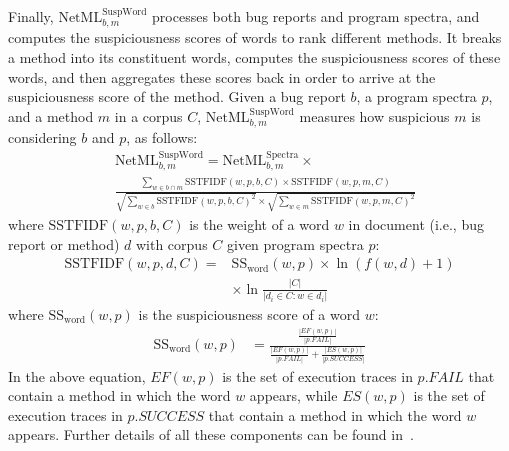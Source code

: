 Finally, $\text{NetML}^\text{SuspWord}_{b,m}$ processes both bug reports and program spectra, and computes the suspiciousness scores of words to rank different methods. It breaks a method into its constituent words, computes the suspiciousness scores of these words, and then aggregates these scores back in order to arrive at the suspiciousness score of the method. Given a bug report $b$, a program spectra $p$, and a method $m$ in a corpus $C$, $\text{NetML}^\text{SuspWord}_{b,m}$ measures how suspicious $m$ is considering $b$ and $p$,  as follows: %
\begin{align}
&\text{NetML}^\text{SuspWord}_{b,m} = \text{NetML}^\text{Spectra}_{b, m} \times \\
&\frac{\sum\limits_{w\in b \cap m} \text{SSTFIDF}(w,p,b,C)\times \text{SSTFIDF}(w,p,m,C)}{\sqrt{\sum\limits_{w \in b} \text{SSTFIDF}(w,p,b,C)^2} \times \sqrt{\sum\limits_{w \in m} \text{SSTFIDF}(w,p,m,C)^2}}
\label{eq:sum_vsm_susp}
\end{align}
where 
$\text{SSTFIDF}(w,p,b,C)$ is the weight of a word $w$ in document (i.e., bug report or method) $d$ with corpus $C$ given program spectra $p$:
\begin{align}
\text{SSTFIDF}(w,p,d,C) = &\text{SS}_{\text{word}}(w,p)\times \ln(f(w,d)+1) \nonumber\\
&\times \ln\frac{|C|}{|{d_i\in C : w \in d_i }|}
\end{align}
where $\text{SS}_{\text{word}}(w,p)$ is the suspiciousness score of a word $w$:
\begin{align}
\text{SS}_{\text{word}}(w,p) &= \frac{\frac{|EF(w,p)|}{|p.FAIL|}}{\frac{|EF(w,p)|}{|p.FAIL|}+\frac{|ES(w,p)|}{|p.SUCCESS|}}
\label{eq:ss}
\end{align}
In the above equation, $EF(w,p)$ is the set of execution traces in $p.FAIL$ that contain a method in which the word $w$ appears, while $ES(w,p)$ is the set of execution traces in $p.SUCCESS$ that contain a method in which the word $w$ appears. Further details of all these components can be found in~\cite{Le:2015:IRS:2786805.2786880}.



